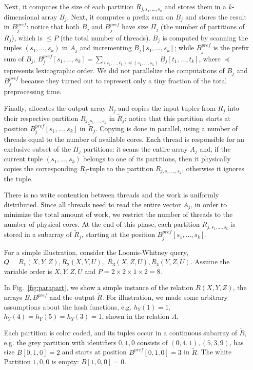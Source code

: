 Next, it computes the size of each partition
$R_{j,s_1,\ldots,s_k}$ and stores them in a $k$-dimensional array
$B_j$.  Next, it computes a prefix sum on $B_j$ and stores the result
in $B^{pref}_j$: notice that both $B_j$ and $B^{pref}_j$ have size $\Pi_j$ (the
number of partitions of $R_j$), which is $\leq P$ (the total number of
threads).  $B_j$ is computed by scanning the tuples
$(s_1, \ldots, s_k)$ in $A_j$ and incrementing
$B_j[s_1, \ldots, s_k]$; while $B^{pref}_j$ is the prefix sum of $B_j$,
$B^{pref}_j[s_1, \ldots, s_k] = \sum_{(t_1,\ldots,t_k)\preceq
  (s_1,\ldots,s_k)} B_j[t_1,\ldots,t_k]$, where $\preceq$ represents
lexicographic order.  We did not parallelize the computations of $B_j$
and $B^{pref}_j$ because they turned out to represent only a tiny fraction of
the total preprocessing time.  

Finally, \name allocates the output
array $\tilde R_j$ and copies the input tuples from $R_j$ into their
respective partition $R_{j,s_1,\ldots,s_k}$ in $\tilde R_j$: notice
that this partition starts at position $B^{pref}_j[s_1,\ldots,s_k]$ in
$\tilde R_j$.  Copying is done in parallel, using a number of threads
equal to the number of available cores.  Each thread is responsible
for an exclusive subset of the $\Pi_j$ partitions: it scans the entire
array $A_j$ and, if the current tuple $(s_1, \ldots, s_k)$ belongs to
one of its partitions, then it physically copies the corresponding
$R_j$-tuple to the partition $R_{j,s_1,\ldots, s_k}$, otherwise it
ignores the tuple.  

There is no write contention between threads and
the work is uniformly distributed.  Since all threads need to read the
entire vector $A_j$, in order to minimize the total amount of work, we
restrict the number of threads to the number of physical cores. At
the end of this phase, each partition $R_{j,s_1,\ldots,s_k}$ is stored
in a subarray of $\tilde R_j$, starting at the position
$B^{pref}_j[s_1, \ldots, s_k]$.

\begin{example} \label{ex:partition} For a simple illustration,
  consider the Loomis-Whitney query,
  $Q=R_1(X, Y, Z), R_2(X, Y, U),$ $R_3(X, Z, U), R_4(Y, Z, U)$.  Assume
  the variable order is $X,Y,Z,U$ and
  $P = 2 \times 2 \times 1 \times 2 = 8$.
  
  
  In Fig.~\ref{fig:parapart}, we show a simple instance of the
  relation $R(X,Y,Z)$, the arrays $B, B^{pref}$ and the output
  $\tilde R$.  For illustration, we made some arbitrary assumptions
  about the hash functions, e.g. $h_Y(1)=1$, $h_Y(4)=h_Y(5)=h_Y(3)=1$,
  shown in the relation $A$.  
  
  
  
  
  Each partition is color coded, and its tuples occur in a continuous
  subarray of $\tilde R$, e.g.  the grey partition with identifiers
  $0,1,0$ consists of $(0,4,1), (5,3,9)$, has size $B[0,1,0]=2$ and
  starts at position $B^{pref}[0,1,0]=3$ in $\tilde R$. The white
  Partition $1,0,0$ is empty: $B[1,0,0]=0$.
\end{example}

